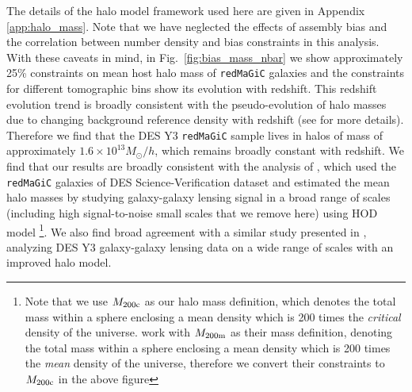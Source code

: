 \documentclass[aps, prd,twocolumn,superscriptaddress,nofootinbib,preprintnumbers]{revtex4-1}
\newcommand{\redmagic}{\texttt{redMaGiC} }
\newcommand{\blue}[1]{\textcolor{blue}{#1}}
\begin{document}
The details of the halo model framework used here are given in Appendix \ref{app:halo_mass}. Note that we have neglected the effects of assembly bias and the correlation between number density and bias constraints in this analysis. With these caveats in mind, in Fig.~\ref{fig:bias_mass_nbar} we show approximately 25\% constraints on mean host halo mass of \redmagic galaxies and the constraints for different tomographic bins show its evolution with redshift. This redshift evolution trend is broadly consistent with the pseudo-evolution of halo masses due to changing background reference density with redshift (see \citep{Diemer_2013} for more details). Therefore we find that the DES Y3 \redmagic sample lives in halos of mass of approximately $1.6 \times 10^{13} M_{\odot}/h$, which remains broadly constant with redshift. We find that our results are broadly consistent with the analysis of \citep{Clampitt_2016}, which used the \redmagic galaxies of DES Science-Verification dataset and estimated the mean halo masses by studying galaxy-galaxy lensing signal in a broad range of scales (including high signal-to-noise small scales that we remove here) using HOD model \footnote{Note that we use $M_{\rm 200c}$ as our halo mass definition, which denotes the total mass within a sphere enclosing a mean density which is 200 times the \textit{critical} density of the universe. \citet{Clampitt_2016} work with $M_{\rm 200m}$ as their mass definition, denoting the total mass within a sphere enclosing a mean density which is 200 times the \textit{mean} density of the universe, therefore we convert their constraints to $M_{\rm 200c}$ in the above figure}. We also find broad agreement with a similar study presented in \citet{zacharegkas_hod}, analyzing DES Y3 galaxy-galaxy lensing data on a wide range of scales with an improved halo model. 




\end{document}
